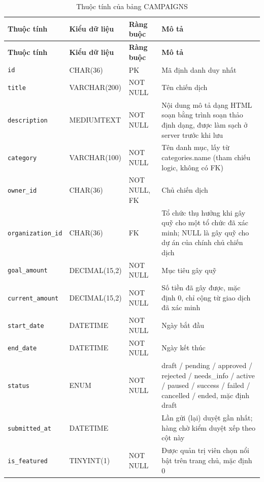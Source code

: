 {\small
\begin{longtable}{|P{3.2cm}|P{2.8cm}|P{2.2cm}|p{5.4cm}|}
    \caption{Thuộc tính của bảng CAMPAIGNS}
    \label{tab:campaigns} \\
    \hline
    \textbf{Thuộc tính} & \textbf{Kiểu dữ liệu} & \textbf{Ràng buộc} & \textbf{Mô tả} \\
    \hline
    \endfirsthead
    \hline
    \textbf{Thuộc tính} & \textbf{Kiểu dữ liệu} & \textbf{Ràng buộc} & \textbf{Mô tả} \\
    \hline
    \endhead

    \texttt{id} & CHAR(36) & PK & Mã định danh duy nhất \\
    \hline
    \texttt{title} & VARCHAR(200) & NOT NULL & Tên chiến dịch \\
    \hline
    \texttt{description} & MEDIUMTEXT & NOT NULL & Nội dung mô tả dạng HTML soạn bằng trình soạn thảo định dạng, được làm sạch ở server trước khi lưu \\
    \hline
    \texttt{category} & VARCHAR(100) & NOT NULL & Tên danh mục, lấy từ categories.name (tham chiếu logic, không có FK) \\
    \hline
    \texttt{owner\_\allowbreak{}id} & CHAR(36) & NOT NULL, FK & Chủ chiến dịch \\
    \hline
    \texttt{organization\_\allowbreak{}id} & CHAR(36) & FK & Tổ chức thụ hưởng khi gây quỹ cho một tổ chức đã xác minh; NULL là gây quỹ cho dự án của chính chủ chiến dịch \\
    \hline
    \texttt{goal\_\allowbreak{}amount} & DECIMAL(15,2) & NOT NULL & Mục tiêu gây quỹ \\
    \hline
    \texttt{current\_\allowbreak{}amount} & DECIMAL(15,2) & NOT NULL & Số tiền đã gây được, mặc định 0, chỉ cộng từ giao dịch đã xác minh \\
    \hline
    \texttt{start\_\allowbreak{}date} & DATETIME & NOT NULL & Ngày bắt đầu \\
    \hline
    \texttt{end\_\allowbreak{}date} & DATETIME & NOT NULL & Ngày kết thúc \\
    \hline
    \texttt{status} & ENUM & NOT NULL & draft / pending / approved / rejected / needs\_\allowbreak{}info / active / paused / success / failed / cancelled / ended, mặc định draft \\
    \hline
    \texttt{submitted\_\allowbreak{}at} & DATETIME &  & Lần gửi (lại) duyệt gần nhất; hàng chờ kiểm duyệt xếp theo cột này \\
    \hline
    \texttt{is\_\allowbreak{}featured} & TINYINT(1) & NOT NULL & Được quản trị viên chọn nổi bật trên trang chủ, mặc định 0 \\

\end{longtable}}
